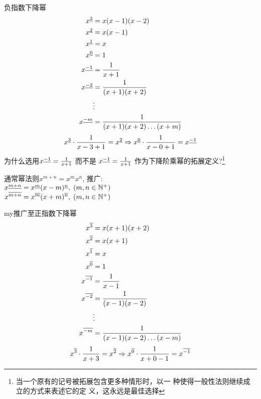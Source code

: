 负指数下降幂
\begin{align*}
    x^{\underline{3}}  &= x(x-1)(x-2) \\
    x^{\underline{2}}  &= x(x-1) \\
    x^{\underline{1}}  &= x \\
    x^{\underline{0}}  &= 1 \\
    x^{\underline{-1}} &= \frac{1}{x+1} \\
    x^{\underline{-2}} &= \frac{1}{(x+1)(x+2)} \\
    &\vdots \\
    x^{\underline{-m}} &= \frac{1}{(x+1)(x+2)\dots(x+m)} \\
\end{align*}
\begin{equation*}
    x^{\underline{3}}\cdot \frac{1}{x-3+1} = x^{\underline{2}} \Rightarrow 
    x^{\underline{0}}\cdot \frac{1}{x-0+1} = x^{\underline{-1}}
\end{equation*}
为什么选用$ x^{\underline{-1}}=\frac{1}{x+1} $ 
而不是 $ x^{\underline{-1}}=\frac{1}{x+1} $ 作为下降阶乘幂的拓展定义?\footnote{当一个原有的记号被拓展包含更多种情形时，以一
种使得一般性法则继续成立的方式来表述它的定
义，这永远是最佳选择}

通常幂法则$ x^{m+n}=x^m x^n $, 
推广:\\
{\color{red}$ x^{\underline{m+n}} = x^{\underline{m}}(x-m)^{\underline{n}},\;(m,n\in\mathbb{N}^+) $ }\\
{\color{red}$ x^{\overline{m+n}} = x^{\overline{m}}(x+m)^{\overline{n}},\;(m,n\in\mathbb{N}^+) $ }

{my}推广至正指数下降幂
\begin{align*}
    x^{\overline{3}}  &= x(x+1)(x+2) \\
    x^{\overline{2}}  &= x(x+1) \\
    x^{\overline{1}}  &= x \\
    x^{\overline{0}}  &= 1 \\
    x^{\overline{-1}} &= \frac{1}{x-1} \\
    x^{\overline{-2}} &= \frac{1}{(x-1)(x-2)} \\
    &\vdots \\
    x^{\overline{-m}} &= \frac{1}{(x-1)(x-2)\dots(x-m)} \\
\end{align*}
\begin{equation*}
    x^{\overline{3}}\cdot \frac{1}{x+3} = x^{\overline{2}} \Rightarrow 
    x^{\overline{0}}\cdot \frac{1}{x+0-1} = x^{\overline{-1}}
\end{equation*}


